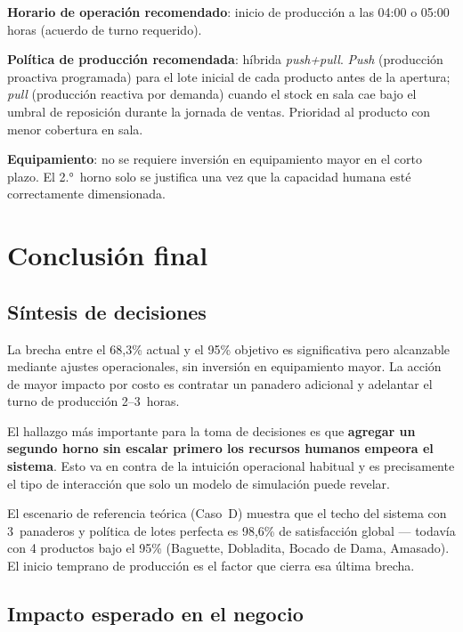 \documentclass[12pt]{article}
\begin{document}
\medskip
\noindent\textbf{Horario de operación recomendado}: inicio de producción a las 04:00 o 05:00 horas (acuerdo de turno requerido).

\medskip
\noindent\textbf{Política de producción recomendada}: híbrida \textit{push+pull}. \textit{Push} (producción proactiva programada) para el lote inicial de cada producto antes de la apertura; \textit{pull} (producción reactiva por demanda) cuando el stock en sala cae bajo el umbral de reposición durante la jornada de ventas. Prioridad al producto con menor cobertura en sala.

\medskip
\noindent\textbf{Equipamiento}: no se requiere inversión en equipamiento mayor en el corto plazo. El 2.°~horno solo se justifica una vez que la capacidad humana esté correctamente dimensionada.

\newpage
\section{Conclusión final}

\subsection{Síntesis de decisiones}

La brecha entre el 68,3\% actual y el 95\% objetivo es significativa pero alcanzable mediante ajustes operacionales, sin inversión en equipamiento mayor. La acción de mayor impacto por costo es contratar un panadero adicional y adelantar el turno de producción 2--3~horas.

El hallazgo más importante para la toma de decisiones es que \textbf{agregar un segundo horno sin escalar primero los recursos humanos empeora el sistema}. Esto va en contra de la intuición operacional habitual y es precisamente el tipo de interacción que solo un modelo de simulación puede revelar.

El escenario de referencia teórica (Caso~D) muestra que el techo del sistema con 3~panaderos y política de lotes perfecta es 98,6\% de satisfacción global --- todavía con 4 productos bajo el 95\% (Baguette, Dobladita, Bocado de Dama, Amasado). El inicio temprano de producción es el factor que cierra esa última brecha.

\subsection{Impacto esperado en el negocio}
\end{document}
